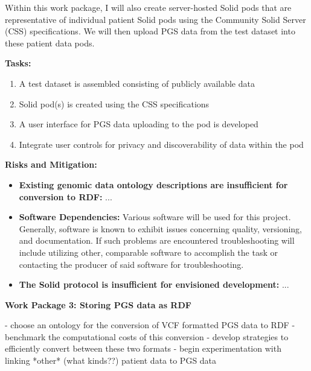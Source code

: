\documentclass[11pt]{article}
\begin{document}
Within this work package, I will also create server-hosted Solid pods that are representative of individual patient Solid pods using the Community Solid Server (CSS) specifications. 
We will then upload PGS data from the test dataset into these patient data pods. 

\textbf{Tasks:}  
\begin{enumerate}
	\item A test dataset is assembled consisting of publicly available data
	\item Solid pod(s) is created using the CSS specifications
	\item A user interface for PGS data uploading to the pod is developed
	\item Integrate user controls for privacy and discoverability of data within the pod
\end{enumerate}

\textbf{Risks and Mitigation:} 
\begin{itemize}
	\item \textbf{Existing genomic data ontology descriptions are insufficient for conversion to RDF:} ...
	\item \textbf{Software Dependencies:} Various software will be used for this project. Generally, software is known to exhibit issues concerning quality, versioning, and documentation. If such problems are encountered troubleshooting will include utilizing other, comparable software to accomplish the task or contacting the producer of said software for troubleshooting.
	\item \textbf{The Solid protocol is insufficient for envisioned development:} ...
\end{itemize}

\textbf{Work Package 3:  Storing PGS data as RDF}

- choose an ontology for the conversion of VCF formatted PGS data to RDF
- benchmark the computational costs of this conversion
- develop strategies to efficiently convert between these two formats
- begin experimentation with linking *other* (what kinds??) patient data to PGS data
\end{document}
